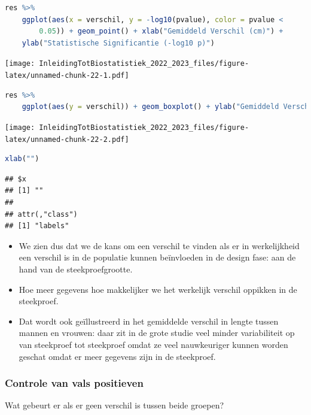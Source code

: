 \documentclass[
  12pt,dutch,coursenotes]{book}
\begin{document}
\begin{lstlisting}[language=R]
res %>%
    ggplot(aes(x = verschil, y = -log10(pvalue), color = pvalue <
        0.05)) + geom_point() + xlab("Gemiddeld Verschil (cm)") +
    ylab("Statistische Significantie (-log10 p)")
\end{lstlisting}

\texttt{[image: InleidingTotBiostatistiek\_2022\_2023\_files/figure-latex/unnamed-chunk-22-1.pdf]}

\begin{lstlisting}[language=R]
res %>%
    ggplot(aes(y = verschil)) + geom_boxplot() + ylab("Gemiddeld Verschil (cm)")
\end{lstlisting}

\texttt{[image: InleidingTotBiostatistiek\_2022\_2023\_files/figure-latex/unnamed-chunk-22-2.pdf]}

\begin{lstlisting}[language=R]
xlab("")
\end{lstlisting}

\begin{lstlisting}
## $x
## [1] ""
## 
## attr(,"class")
## [1] "labels"
\end{lstlisting}

\begin{itemize}
\item
  We zien dus dat we de kans om een verschil te vinden als er in werkelijkheid een verschil is in de populatie kunnen beïnvloeden in de design fase: aan de hand van de steekproefgrootte.
\item
  Hoe meer gegevens hoe makkelijker we het werkelijk verschil oppikken in de steekproef.
\item
  Dat wordt ook geïllustreerd in het gemiddelde verschil in lengte tussen mannen en vrouwen: daar zit in de grote studie veel minder variabiliteit op van steekproef tot steekproef omdat ze veel nauwkeuriger kunnen worden geschat omdat er meer gegevens zijn in de steekproef.
\end{itemize}

\hypertarget{controle-van-vals-positieven}{%
\subsubsection{Controle van vals positieven}\label{controle-van-vals-positieven}}

Wat gebeurt er als er geen verschil is tussen beide groepen?
\end{document}
